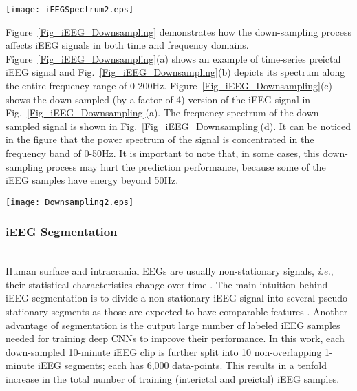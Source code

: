 \documentclass[journal]{IEEEtran}
\begin{document}
\begin{figure*}[!ht]
	\centering
	\texttt{[image: iEEGSpectrum2.eps]}
	\caption{Frequency spectra of interictal (blue) and preictal (red) iEEG signals collected by the 16 implanted electrodes (channels) of the seizure advisory system in Patient~1. Ch1-Ch16 stand for Channels 1 to 16.}
	\label{Fig_iEEG_Spectrum}
\end{figure*}

Figure~\ref{Fig_iEEG_Downsampling} demonstrates how the down-sampling process affects iEEG signals in both time and frequency domains. Figure~\ref{Fig_iEEG_Downsampling}(a) shows an example of time-series preictal iEEG signal and Fig.~\ref{Fig_iEEG_Downsampling}(b) depicts its spectrum along the entire frequency range of 0-200Hz. Figure~\ref{Fig_iEEG_Downsampling}(c) shows the down-sampled (by a factor of 4) version of the iEEG signal in Fig.~\ref{Fig_iEEG_Downsampling}(a). The frequency spectrum of the down-sampled signal is shown in Fig.~\ref{Fig_iEEG_Downsampling}(d).
It can be noticed in the figure that the power spectrum of the signal is concentrated in the frequency band of 0-50Hz. It is important to note that, in some cases, this down-sampling process may hurt the prediction performance, because some of the iEEG samples have energy beyond 50Hz.

\begin{figure*}[!ht]
	\centering
	\texttt{[image: Downsampling2.eps]}
	\caption{Time-series iEEG signals and their corresponding spectra: (a) and (b) original iEEG clip and its 200Hz frequency spectrum; (c) and (d) downsampled-by-4 iEEG clip and its 50Hz frequency spectrum.}
	\label{Fig_iEEG_Downsampling}
\end{figure*}

\subsubsection{iEEG Segmentation} ~\\
Human surface and intracranial EEGs are usually non-stationary signals, \textit{i.e.}, their statistical characteristics change over time \cite{NonStationary1}. The main intuition behind iEEG segmentation is to divide a non-stationary iEEG signal into several pseudo-stationary segments as those are expected to have comparable features \cite{NonStationary2}. Another advantage of segmentation is the output large number of labeled iEEG samples needed for training deep CNNs to improve their performance. In this work, each down-sampled 10-minute iEEG clip is further split into 10 non-overlapping 1-minute iEEG segments; each has 6,000 data-points. This results in a tenfold increase in the total number of training (interictal and preictal) iEEG samples.
\end{document}
